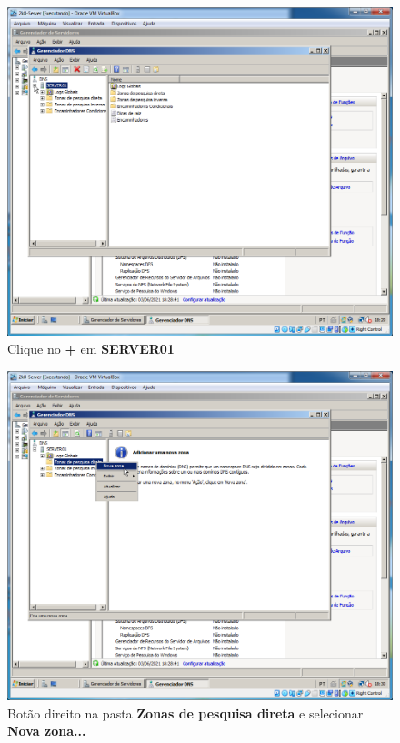 \documentclass[10pt]{article}
\begin{document}
\begin{figure}[H]
    \centering
    \caption{Clique no \textbf{+} em \textbf{SERVER01}}
    \label{fig:DNS012}
    \includegraphics[width=\linewidth]{images/windows_server/dns/012.png}
\end{figure}
\begin{figure}[H]
    \centering
    \caption{Botão direito na pasta \textbf{Zonas de pesquisa direta} e selecionar \textbf{Nova zona...}}
    \label{fig:DNS013}
    \includegraphics[width=\linewidth]{images/windows_server/dns/013.png}
\end{figure}
\end{document}
